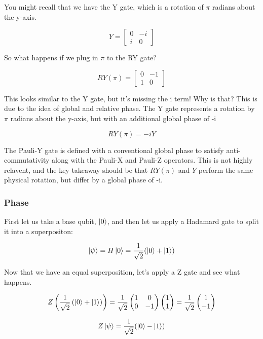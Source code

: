 \documentclass[12pt]{article}
\begin{document}
You might recall that we have the Y gate, which is a rotation of $\pi$ radians about the y-axis.

$$
Y = \begin{bmatrix}
0 & -i \\
i & 0
\end{bmatrix}
$$

So what happens if we plug in $\pi$ to the RY gate?

$$
RY(\pi) =
\begin{bmatrix}
0 & -1 \\
1 &  0
\end{bmatrix}
$$

This looks similar to the Y gate, but it's missing the i term! Why is that? This is due to the idea of global and relative phase. The Y gate represents a rotation by $\pi$ radians about the y-axis, but with an additional global phase of -i

$$
RY(\pi) = -iY
$$

The Pauli-Y gate is defined with a conventional global phase to satisfy anti-commutativity along with the Pauli-X and Pauli-Z operators. This is not highly relavent, and the key takeaway should be that $RY(\pi)$ and $Y$ perform the same physical rotation, but differ by a global phase of -i.

\subsubsection{Phase}

First let us take a base qubit, $\ket{0}$, and then let us apply a Hadamard gate to split it into a superpositon:

$$
\ket{\psi} = H\ket{0} = \frac{1}{\sqrt{2}}( \ket{0}  + \ket{1})
$$

Now that we have an equal superposition, let's apply a Z gate and see what happens.

$$
Z\left(\frac{1}{\sqrt{2}}\left(\ket{0}+\ket{1}\right)\right)
= \frac{1}{\sqrt{2}} \begin{pmatrix} 1 & 0 \\ 0 & -1 \end{pmatrix} \begin{pmatrix} 1 \\ 1 \end{pmatrix}
= \frac{1}{\sqrt{2}} \begin{pmatrix} 1 \\ -1 \end{pmatrix}
$$


$$
Z\ket{\psi} = \frac{1}{\sqrt{2}}( \ket{0} - \ket{1})
$$
\end{document}
